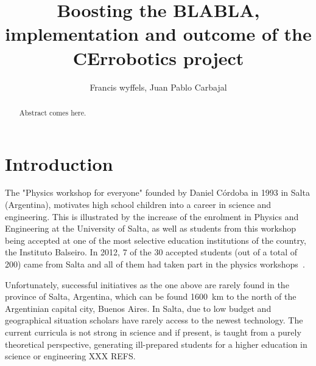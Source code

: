 \documentclass[a4paper]{llncs}
\begin{document}
\linespread{0.965}\selectfont

\mainmatter  %

\title{Boosting the BLABLA, implementation and outcome of the CErrobotics project}

%
%
\author{Francis wyffels, Juan Pablo Carbajal}
%


\maketitle

\begin{abstract}
Abstract comes here.

\end{abstract}

\section{Introduction}
 The "Physics workshop for everyone" founded by Daniel Córdoba in 1993 in Salta (Argentina), motivates high school children into a career in science and engineering.
This is illustrated by the increase of the enrolment in Physics and Engineering at the University of Salta, as well as students from this workshop being accepted at one of the most selective education institutions of the country, the Instituto Balseiro.
In 2012, 7 of the 30 accepted students (out of a total of 200) came from Salta and all of them had taken part in the physics workshops~\cite{salta2012}.

Unfortunately, successful initiatives as the one above are rarely found in the province of Salta, Argentina, which can be found 1600~km to the north of the Argentinian capital city, Buenos Aires.
In Salta, due to low budget and geographical situation scholars have rarely access to the newest technology.
The current curricula is not strong in science and if present, is taught from a purely theoretical perspective, generating ill-prepared students for a higher education in science or engineering XXX REFS.
\end{document}

